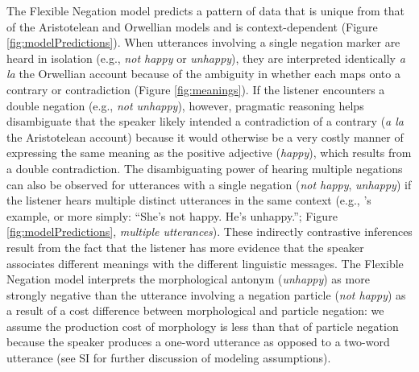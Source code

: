 \documentclass[floatsintext,doc]{apa6}
\let\rmarkdownfootnote\footnote%
\def\footnote{\protect\rmarkdownfootnote}
\newcommand{\ourmodel}{Flexible Negation\xspace}
\begin{document}
The \ourmodel model predicts a pattern of data that is unique from that of the Aristotelean and Orwellian models and is context-dependent (Figure \ref{fig:modelPredictions}).
When utterances involving a single negation marker are heard in isolation (e.g., \emph{not happy} or \emph{unhappy}), they are interpreted identically \emph{a la} the Orwellian account because of the ambiguity in whether each maps onto a contrary or contradiction (Figure \ref{fig:meanings}).  
If the listener encounters a double negation (e.g., \emph{not unhappy}), however, pragmatic reasoning helps disambiguate that the speaker likely intended a contradiction of a contrary (\emph{a la} the Aristotelean account) because it would otherwise be a very costly manner of expressing the same meaning as the positive adjective (\emph{happy}), which  results from a double contradiction.
The disambiguating power of hearing multiple negations can also be observed for utterances with a single negation (\emph{not happy}, \emph{unhappy}) if the listener hears multiple distinct utterances in the same context (e.g., 's example, or more simply: ``She's not happy. He's unhappy.''; Figure \ref{fig:modelPredictions}, \emph{multiple utterances}). These indirectly contrastive inferences result from the fact that the listener has more evidence that the speaker associates different meanings with the different linguistic messages.
The \ourmodel model interprets the morphological antonym (\emph{unhappy}) as more strongly negative than the utterance involving a negation particle (\emph{not happy}) as a result of a cost difference between morphological and particle negation: we assume the production cost of morphology is less than that of particle negation because the speaker produces a one-word utterance as opposed to a two-word utterance (see SI for further discussion of modeling assumptions).

%

\end{document}
